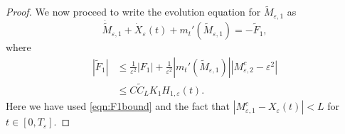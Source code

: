 \documentclass[]{article}
\theoremstyle{remark}
\begin{document}
\begin{proof}






We now proceed to write the evolution equation for $\widetilde{M}_{\varepsilon,1}$ as
    \[\dot{\widetilde{M}}_{\varepsilon,1}+\dot{X}_\varepsilon(t)+m_{t}'(\widetilde{M}_{\varepsilon,1})=-\tilde{F}_1,\]
    where \begin{align*}
        |\tilde{F}_1|&\leq{}\frac{1}{\varepsilon^ 2}|F_1|+\frac{1}{\varepsilon^ 2}|m_t'(\widetilde{M}_{\varepsilon,1})||M_{\varepsilon,2}^c-\varepsilon^2|\\
        &\leq{}C\tilde{C}_LK_1H_{1,\varepsilon}(t).
    \end{align*}
Here we have used \eqref{eqn:F1bound} and the fact that $|M_{\varepsilon,1}^c-X_\varepsilon(t)|<L$ for $t\in[0,T_\varepsilon]$.


\end{proof}
\end{document}
